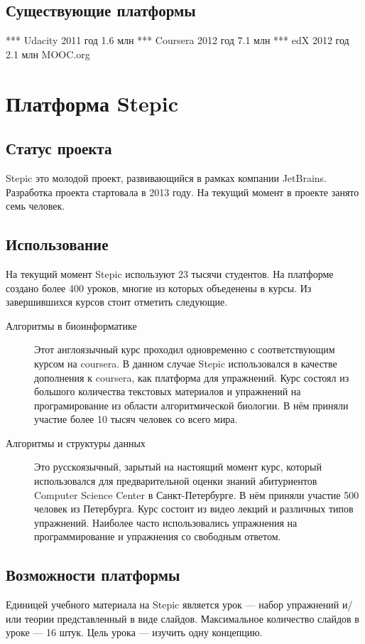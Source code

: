 \documentclass{matmex-diploma-custom}
\begin{document}
\subsection*{Существующие платформы}

*** Udacity
   2011 год
   1.6 млн
*** Coursera
   2012 год
   7.1 млн
*** edX
   2012 год
   2.1 млн
   MOOC.org

\section{Платформа Stepic}

\subsection{Статус проекта}
Stepic\cite{stepic} это молодой проект, развивающийся в рамках компании
JetBrains. Разработка проекта стартовала в 2013 году. На текущий
момент в проекте занято семь человек.

\subsection{Использование}
На текущий момент Stepic используют 23 тысячи студентов. На платформе
создано более 400 уроков, многие из которых объеденены в курсы. Из
завершившихся курсов стоит отметить следующие.

\begin{description}
\item[Алгоритмы в биоинформатике] Этот англоязычный курс проходил
  одновременно с соответствующим курсом на coursera. В данном случае
  Stepic использовался в качестве дополнения к coursera, как платформа
  для упражнений. Курс состоял из большого количества текстовых
  материалов и упражнений на програмирование из области
  алгоритмической биологии. В нём приняли участие более 10 тысяч
  человек со всего мира.

\item[Алгоритмы и структуры данных] Это русскоязычный, зарытый на
  настоящий момент курс, который использовался для предварительной
  оценки знаний абитуриентов Computer Science Center в
  Санкт-Петербурге. В нём приняли участие 500 человек из
  Петербурга. Курс состоит из видео лекций и различных типов
  упражнений. Наиболее часто использовались упражнения на
  программирование и упражнения со свободным ответом.
\end{description}

\subsection{Возможности платформы}
Единицей учебного материала на Stepic является урок --- набор упражнений
и/или теории представленный в виде слайдов. Максимальное количество
слайдов в уроке --- 16 штук. Цель урока --- изучить одну концепцию.
\end{document}
